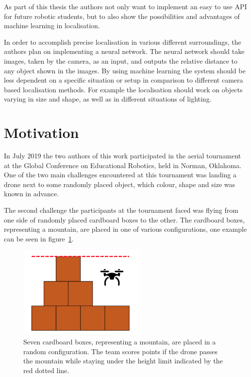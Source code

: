As part of this thesis the authors not only want to implement an easy to use API for future robotic students, but to also show the possibilities and advantages of machine learning in localisation.

In order to accomplish precise localisation in various different surroundings, the authors plan on implementing a neural network. The neural network should take images, taken by the camera, as an input, and outputs the relative distance to any object shown in the images. By using machine learning the system should be less dependent on a specific situation or setup in comparison to different camera based localisation methods. For example the localisation should work on objects varying in size and shape, as well as in different situations of lighting.

\section{Motivation}
\label{sec:introduction_motivation}
In July 2019 the two authors of this work participated in the aerial tournament at the Global Conference on Educational Robotics, held in Norman, Oklahoma. One of the two main challenges encountered at this tournament was landing a drone next to some randomly placed object, which colour, shape and size was known in advance.

The second challenge the participants at the tournament faced was flying from one side of randomly placed cardboard boxes to the other. The cardboard boxes, representing a mountain, are placed in one of various configurations, one example can be seen in figure~\ref{pic:introduction_motivation_mountain}.

\begin{figure}[h]
	\centering
	\includegraphics[width=2.5in]{img/introduction_motivation_mountain.png}
	\caption{Seven cardboard boxes, representing a mountain, are placed in a random configuration. The team scores points if the drone passes the mountain while staying under the height limit indicated by the red dotted line.}
	\label{pic:introduction_motivation_mountain}
\end{figure}

